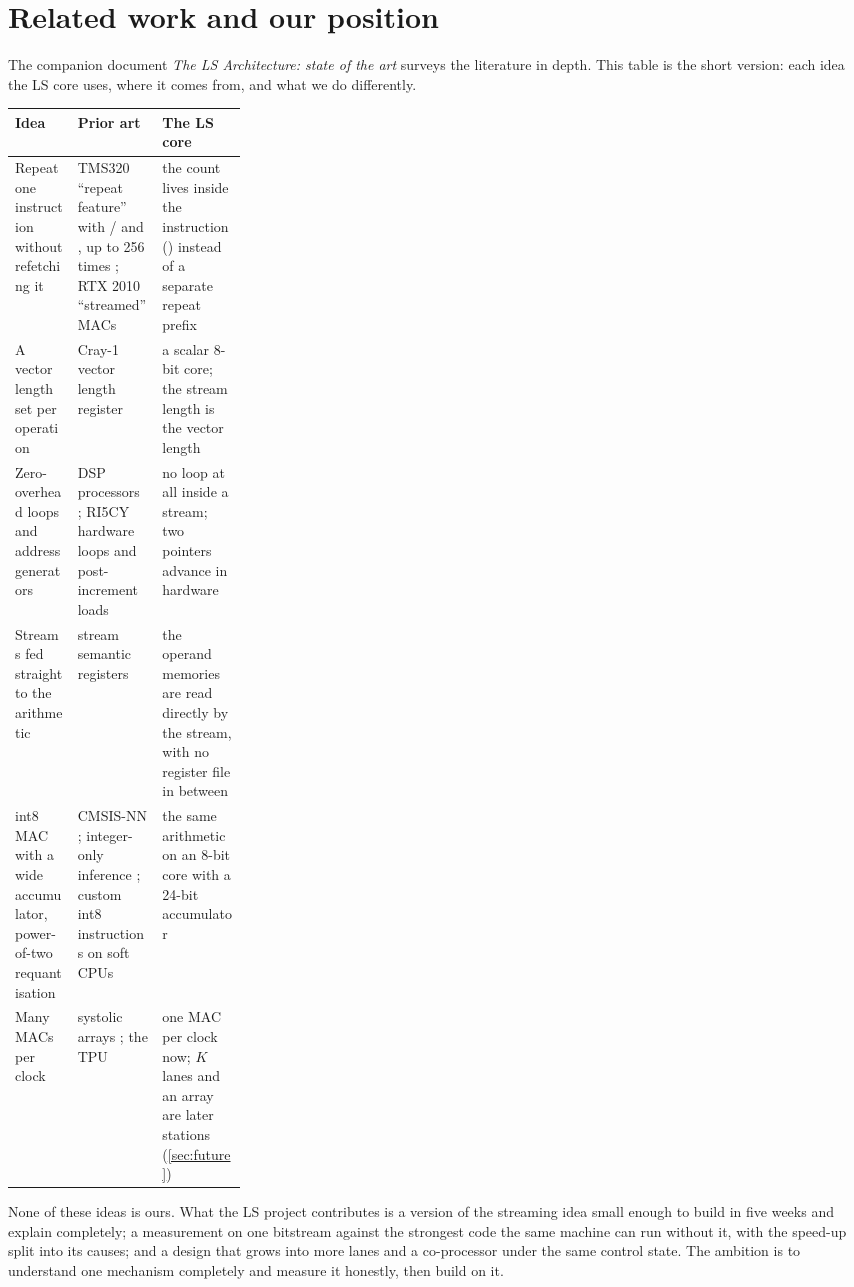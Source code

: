 \section{Related work and our position}\label{sec:related}

The companion document \emph{The LS Architecture: state of the art} surveys the literature in depth. This table is the short version: each idea the LS core uses, where it comes from, and what we do differently.

\begin{center}\small
\begin{tabularx}{\linewidth}{@{}>{\raggedright\arraybackslash}p{0.27\linewidth} L L@{}}
\toprule
Idea & Prior art & The LS core \\
\midrule
Repeat one instruction without refetching it & TMS320 ``repeat feature'' with / and , up to 256 times \citep{ti1990tms320c25}; RTX 2010 ``streamed'' MACs \citep{harris_rtx} & the count lives inside the instruction () instead of a separate repeat prefix \\
A vector length set per operation & Cray-1 vector length register \citep{russell1978cray} & a scalar 8-bit core; the stream length is the vector length \\
Zero-overhead loops and address generators & DSP processors \citep{eyre2000evolution}; RI5CY hardware loops and post-increment loads \citep{gautschi2017near} & no loop at all inside a stream; two pointers advance in hardware \\
Streams fed straight to the arithmetic & stream semantic registers \citep{schuiki2021ssr} & the operand memories are read directly by the stream, with no register file in between \\
int8 MAC with a wide accumulator, power-of-two requantisation & CMSIS-NN \citep{lai2018cmsisnn}; integer-only inference \citep{jacob2018quantization}; custom int8 instructions on soft CPUs \citep{prakash2023cfu} & the same arithmetic on an 8-bit core with a 24-bit accumulator \\
Many MACs per clock & systolic arrays \citep{kung1982systolic}; the TPU \citep{jouppi2017tpu} & one MAC per clock now; $K$ lanes and an array are later stations (\cref{sec:future}) \\
\bottomrule
\end{tabularx}
\end{center}

None of these ideas is ours. What the LS project contributes is a version of the streaming idea small enough to build in five weeks and explain completely; a measurement on one bitstream against the strongest code the same machine can run without it, with the speed-up split into its causes; and a design that grows into more lanes and a co-processor under the same control state. The ambition is to understand one mechanism completely and measure it honestly, then build on it.
